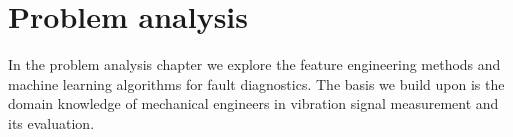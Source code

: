 \chapter{Problem analysis} \label{chapter:problem-analysis}
In the problem analysis chapter we explore the feature engineering methods and machine learning algorithms for fault diagnostics. The basis we build upon is the domain knowledge of mechanical engineers in vibration signal measurement and its evaluation.




 
